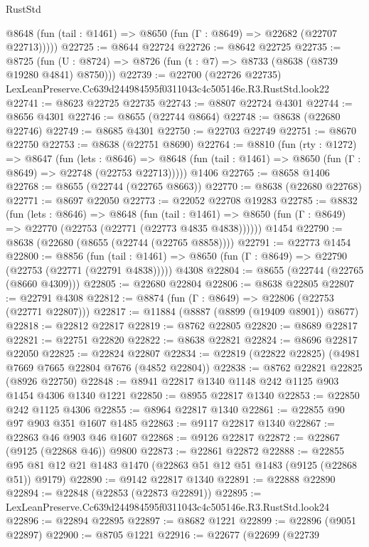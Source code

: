 \begin{lexlean}{RustStd}
\begin{coremodule}
      @8648 (fun (tail : @1461) => @8650 (fun (Γ : @8649) => @22682 (@22707 @22713)))))
@22725 := @8644 @22724
@22726 := @8642 @22725
@22735 := @8725
    (fun (U : @8724) => @8726 (fun (t : @7) => @8733 (@8638 (@8739 @19280 @4841) @8750)))
@22739 := @22700 (@22726 @22735) LexLeanPreserve.Cc639d244984595f0311043c4c505146e.R3.RustStd.look22
@22741 := @8623 @22725 @22735
@22743 := @8807 @22724 @4301
@22744 := @8656 @4301
@22746 := @8655 (@22744 @8664)
@22748 := @8638 (@22680 @22746)
@22749 := @8685 @4301
@22750 := @22703 @22749
@22751 := @8670 @22750
@22753 := @8638 (@22751 @8690)
@22764 := @8810
    (fun (rty : @1272) =>
    @8647
      (fun (lets : @8646) =>
      @8648 (fun (tail : @1461) => @8650 (fun (Γ : @8649) => @22748 (@22753 @22713)))))
    @1406
@22765 := @8658 @1406
@22768 := @8655 (@22744 (@22765 @8663))
@22770 := @8638 (@22680 @22768)
@22771 := @8697 @22050
@22773 := @22052 @22708 @19283
@22785 := @8832
    (fun (lets : @8646) =>
    @8648
      (fun (tail : @1461) =>
      @8650 (fun (Γ : @8649) => @22770 (@22753 (@22771 (@22773 @4835 @4838))))))
    @1454
@22790 := @8638 (@22680 (@8655 (@22744 (@22765 @8858))))
@22791 := @22773 @1454
@22800 := @8856
    (fun (tail : @1461) => @8650 (fun (Γ : @8649) => @22790 (@22753 (@22771 (@22791 @4838)))))
    @4308
@22804 := @8655 (@22744 (@22765 (@8660 @4309)))
@22805 := @22680 @22804
@22806 := @8638 @22805
@22807 := @22791 @4308
@22812 := @8874 (fun (Γ : @8649) => @22806 (@22753 (@22771 @22807)))
@22817 := @11884 (@8887 (@8899 (@19409 @8901)) @8677)
@22818 := @22812 @22817
@22819 := @8762 @22805
@22820 := @8689 @22817
@22821 := @22751 @22820
@22822 := @8638 @22821
@22824 := @8696 @22817 @22050
@22825 := @22824 @22807
@22834 := @22819 (@22822 @22825) (@4981 @7669 @7665 @22804 @7676 (@4852 @22804))
@22838 := @8762 @22821 @22825 (@8926 @22750)
@22848 := @8941 @22817 @1340 @1148 @242 @1125 @903 @1454 @4306 @1340 @1221
@22850 := @8955 @22817 @1340
@22853 := @22850 @242 @1125 @4306
@22855 := @8964 @22817 @1340
@22861 := @22855 @90 @97 @903 @351 @1607 @1485
@22863 := @9117 @22817 @1340
@22867 := @22863 @46 @903 @46 @1607
@22868 := @9126 @22817
@22872 := @22867 (@9125 (@22868 @46)) @9800
@22873 := @22861 @22872
@22888 := @22855 @95 @81 @12 @21 @1483 @1470 (@22863 @51 @12 @51 @1483 (@9125 (@22868 @51)) @9179)
@22890 := @9142 @22817 @1340
@22891 := @22888 @22890
@22894 := @22848 (@22853 (@22873 @22891))
@22895 := LexLeanPreserve.Cc639d244984595f0311043c4c505146e.R3.RustStd.look24
@22896 := @22894 @22895
@22897 := @8682 @1221
@22899 := @22896 (@9051 @22897)
@22900 := @8705 @1221
@22916 := @22677
    (@22699
      (@22739

\end{coremodule}
\end{lexlean}
